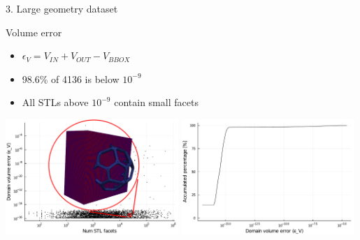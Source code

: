 \documentclass{beamer}
\begin{document}
\begin{frame}{3. Large geometry dataset}

  \begin{block}{Volume error}
  \begin{itemize}
    \item
      $\epsilon_V = V_{IN} + V_{OUT} - V_{BBOX}$
    \item
      98.6\% of 4136 is below $10^{-9}$
    \item
      All STLs above $10^{-9}$ contain small facets
  \end{itemize}
  \end{block}

  \includegraphics[width=0.49\textwidth]{num_stl_facets_volume_error_509317}
  \includegraphics[width=0.49\textwidth]{../analysis/plots/histogram_volume_error}
\end{frame}
\end{document}

